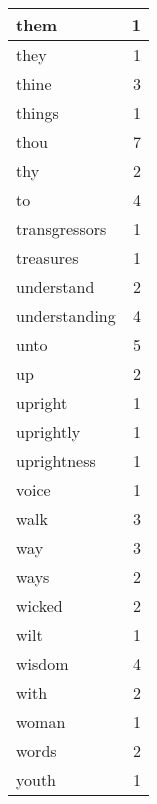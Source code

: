 \begin{center}
\begin{longtable}{l|r}
them & 1\\ \hline 
they & 1\\ \hline 
thine & 3\\ \hline 
things & 1\\ \hline 
thou & 7\\ \hline 
thy & 2\\ \hline 
to & 4\\ \hline 
transgressors & 1\\ \hline 
treasures & 1\\ \hline 
understand & 2\\ \hline 
understanding & 4\\ \hline 
unto & 5\\ \hline 
up & 2\\ \hline 
upright & 1\\ \hline 
uprightly & 1\\ \hline 
uprightness & 1\\ \hline 
voice & 1\\ \hline 
walk & 3\\ \hline 
way & 3\\ \hline 
ways & 2\\ \hline 
wicked & 2\\ \hline 
wilt & 1\\ \hline 
wisdom & 4\\ \hline 
with & 2\\ \hline 
woman & 1\\ \hline 
words & 2\\ \hline 
youth & 1\\ \hline 
\end{longtable}  
\end{center}  


  
\normalsize  

  
  
